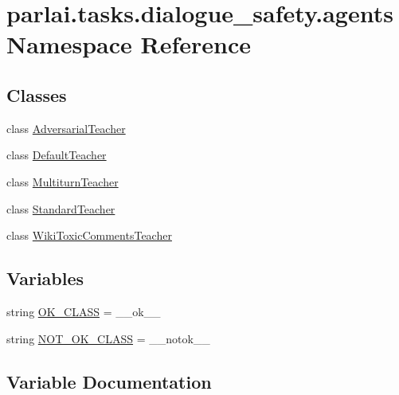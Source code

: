 \hypertarget{namespaceparlai_1_1tasks_1_1dialogue__safety_1_1agents}{}\section{parlai.\+tasks.\+dialogue\+\_\+safety.\+agents Namespace Reference}
\label{namespaceparlai_1_1tasks_1_1dialogue__safety_1_1agents}
\subsection*{Classes}
\begin{DoxyCompactItemize}
\item 
class \hyperlink{classparlai_1_1tasks_1_1dialogue__safety_1_1agents_1_1AdversarialTeacher}{Adversarial\+Teacher}
\item 
class \hyperlink{classparlai_1_1tasks_1_1dialogue__safety_1_1agents_1_1DefaultTeacher}{Default\+Teacher}
\item 
class \hyperlink{classparlai_1_1tasks_1_1dialogue__safety_1_1agents_1_1MultiturnTeacher}{Multiturn\+Teacher}
\item 
class \hyperlink{classparlai_1_1tasks_1_1dialogue__safety_1_1agents_1_1StandardTeacher}{Standard\+Teacher}
\item 
class \hyperlink{classparlai_1_1tasks_1_1dialogue__safety_1_1agents_1_1WikiToxicCommentsTeacher}{Wiki\+Toxic\+Comments\+Teacher}
\end{DoxyCompactItemize}
\subsection*{Variables}
\begin{DoxyCompactItemize}
\item 
string \hyperlink{namespaceparlai_1_1tasks_1_1dialogue__safety_1_1agents_a81255d91e36781d9afe9fd66882d26b0}{O\+K\+\_\+\+C\+L\+A\+SS} = \textquotesingle{}\+\_\+\+\_\+ok\+\_\+\+\_\+\textquotesingle{}
\item 
string \hyperlink{namespaceparlai_1_1tasks_1_1dialogue__safety_1_1agents_a48264e67e5e467abcf83e5cf4f7525f2}{N\+O\+T\+\_\+\+O\+K\+\_\+\+C\+L\+A\+SS} = \textquotesingle{}\+\_\+\+\_\+notok\+\_\+\+\_\+\textquotesingle{}
\end{DoxyCompactItemize}


\subsection{Variable Documentation}
\mbox{\label{namespaceparlai_1_1tasks_1_1dialogue__safety_1_1agents_a48264e67e5e467abcf83e5cf4f7525f2}} 
